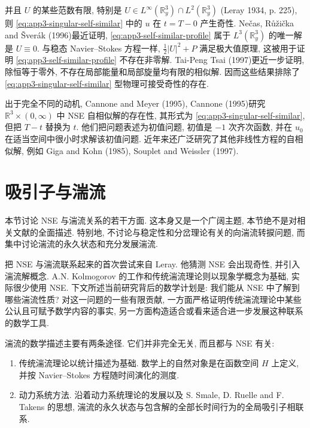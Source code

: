 \hypertarget{appendix-03-page-363}{}
并且 $U$ 的某些范数有限, 特别是 $U\in L^\infty(\mathbb R_y^3)\cap L^2(\mathbb R_y^3)$ (Leray 1934, p. 225), 则 
\eqref{eq:app3-singular-self-similar} 中的 $u$ 在 $t=T-0$ 产生奇性. Nečas, Růžička and Šverák (1996)最近证明, 
\eqref{eq:app3-self-similar-profile} 属于 $L^3(\mathbb R_y^3)$ 的唯一解是 $U\equiv0$. 与稳态 Navier--Stokes 方程一样, $\frac12|U|^2+P$ 满足极大值原理, 这被用于证明 
\eqref{eq:app3-self-similar-profile} 不存在非零解. Tai-Peng Tsai (1997)更近一步证明, 除恒等于零外, 不存在局部能量和局部旋量均有限的相似解. 因而这些结果排除了 
\eqref{eq:app3-singular-self-similar} 型物理可接受奇性的存在.

出于完全不同的动机, Cannone and Meyer (1995), Cannone (1995)研究 $\mathbb R^3\times(0,\infty)$ 中 NSE 自相似解的存在性, 其形式为 
\eqref{eq:app3-singular-self-similar}, 但把 $T-t$ 替换为 $t$. 他们把问题表述为初值问题, 初值是 $-1$ 次齐次函数, 并在 $u_0$ 在适当空间中很小时求解该初值问题. 近年来还广泛研究了其他非线性方程的自相似解, 例如 Giga and Kohn (1985), Souplet and Weissler (1997).

\section{吸引子与湍流}
\label{sec:app3-attractors}
\setcounter{equation}{14}

本节讨论 NSE 与湍流关系的若干方面. 这本身又是一个广阔主题, 本节绝不是对相关文献的全面描述. 特别地, 不讨论与稳定性和分岔理论有关的向湍流转捩问题, 而集中讨论湍流的永久状态和充分发展湍流.

把 NSE 与湍流联系起来的首次尝试来自 Leray. 他猜测 NSE 会出现奇性, 并引入湍流解概念. A.N. Kolmogorov 的工作和传统湍流理论则以现象学概念为基础, 实际很少使用 NSE. 下文所述当前研究背后的数学计划是: 我们能从 NSE 中了解到哪些湍流性质? 对这一问题的一些有限贡献, 一方面严格证明传统湍流理论中某些公认且可赋予数学内容的事实, 另一方面构造适合或看来适合进一步发展这种联系的数学工具.

湍流的数学描述主要有两条途径. 它们并非完全无关, 而且都与 NSE 有关:
\begin{enumerate}
\item 传统湍流理论以统计描述为基础. 数学上的自然对象是在函数空间 $H$ 上定义, 并按 Navier--Stokes 方程随时间演化的测度.
\item 动力系统方法. 沿着动力系统理论的发展以及 S. Smale, D. Ruelle and F. Takens 的思想, 湍流的永久状态与包含解的全部长时间行为的全局吸引子相联系.
\end{enumerate}

\hypertarget{appendix-03-page-364}{}
